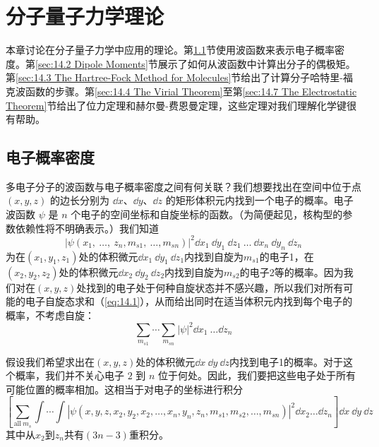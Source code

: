 \chapter{分子量子力学理论}
\label{chap:14}

    \noindent 本章讨论在分子量子力学中应用的理论。第\ref{sec:14.1 Electron Probability Density}节使用波函数来表示电子概率密度。第\ref{sec:14.2 Dipole Moments}节展示了如何从波函数中计算出分子的偶极矩。第\ref{sec:14.3 The Hartree-Fock Method for Molecules}节给出了计算分子哈特里-福克波函数的步骤。第\ref{sec:14.4 The Virial Theorem}至第\ref{sec:14.7 The Electrostatic Theorem}节给出了位力定理和赫尔曼-费恩曼定理，这些定理对我们理解化学键很有帮助。

\section{电子概率密度}
\label{sec:14.1 Electron Probability Density}

    多电子分子的波函数与电子概率密度之间有何关联？我们想要找出在空间中位于点 $\left(x, y, z\right)$ 的边长分别为 $\dd x$、$\dd y$、$\dd z$ 的矩形体积元内找到一个电子的概率。电子波函数 $\psi$ 是 $n$ 个电子的空间坐标和自旋坐标的函数。（为简便起见，核构型的参数依赖性将不明确表示。）我们知道
    \begin{equation}
        \left|\psi\left(x_1,\:\ldots,\:z_n,m_{s1},\:\ldots,m_{sn}\right)\right|^2\dd x_1\:\dd y_1\:\dd z_1\:\ldots\:\dd x_n\:\dd y_n\:\dd z_n
        \label{eq:14.1}
    \end{equation}
    为在$\left(x_1,y_1,z_1\right)$处的体积微元$\dd x_1\:\dd y_1\:\dd z_1$内找到自旋为$m_{s1}$的电子1，在$\left(x_2,y_2,z_2\right)$处的体积微元$\dd x_2\:\dd y_2\:\dd z_2$内找到自旋为$m_{s2}$的电子2等的概率。因为我们对在$\left(x,y,z\right)$处找到的电子处于何种自旋状态并不感兴趣，所以我们对所有可能的电子自旋态求和（\ref{eq:14.1}），从而给出同时在适当体积元内找到每个电子的概率，不考虑自旋：
    \begin{equation}
        \sum_{m_{s1}} \cdots \sum_{m_{sn}}\left|\psi\right|^2\dd x_1\:\ldots\dd z_n
        \label{eq:14.2}
    \end{equation}

    假设我们希望求出在$\left(x,y,z\right)$处的体积微元$\dd x\:\dd y\:\dd z$内找到电子1的概率。对于这个概率，我们并不关心电子 $2$ 到 $n$ 位于何处。因此，我们要把这些电子处于所有可能位置的概率相加。这相当于对电子的坐标进行积分
    \begin{equation}
        \left[\sum_{\text{all}\:m_s} \int \cdots \int \left|\psi\left(x,y,z,x_2,y_2,x_2,\ldots,x_n,y_n,z_n,m_{s1},m_{s2},\ldots,m_{sn}\right)\right|^2\dd x_2\ldots\dd z_n\right]\dd x\:\dd y\:\dd z
        \label{eq:14.3}
    \end{equation}
    其中从$x_2$到$z_n$共有$\left(3n-3\right)$重积分。

